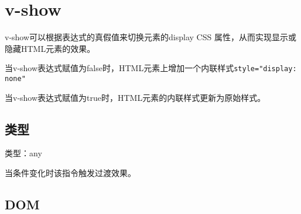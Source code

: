 \begin{lstlisting}[language=JavaScript]

\end{lstlisting}




\begin{lstlisting}[language=JavaScript]

\end{lstlisting}




\begin{lstlisting}[language=JavaScript]

\end{lstlisting}




\begin{lstlisting}[language=JavaScript]

\end{lstlisting}




\begin{lstlisting}[language=JavaScript]

\end{lstlisting}

\section{v-show}

v-show可以根据表达式的真假值来切换元素的display CSS 属性，从而实现显示或隐藏HTML元素的效果。

\begin{compactitem}
\item 当v-show表达式赋值为false时，HTML元素上增加一个内联样式\texttt{style="display: none"}
\item 当v-show表达式赋值为true时，HTML元素的内联样式更新为原始样式。
\end{compactitem}

\subsection{类型}

\begin{compactitem}
\item 类型：any
\end{compactitem}

当条件变化时该指令触发过渡效果。

\subsection{DOM}

